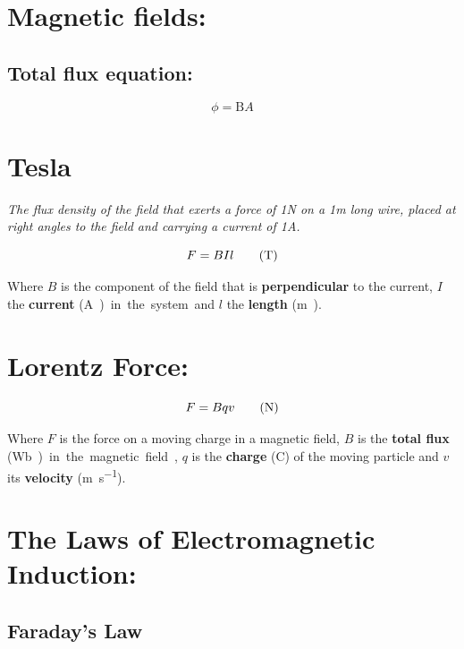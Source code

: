 \documentclass[11pt]{article}
\begin{document}
                          
\section{Magnetic fields: }
\subsection{Total flux equation: }
\begin{equation}
	\phi = \mathrm{B}A\tag{\si\weber}
\end{equation}


  \section{Tesla}
  \begin{center}
  	\textit{The flux density of the field that exerts a force of 1\si{\newton} on a 1\si{\meter} long wire, placed at right angles to the field and carrying a current of 1\si{\ampere}.}
  \end{center}
\begin{equation}
	F=BIl\tag{\si{\tesla}}
\end{equation}
\begin{center}
	Where $B$ is the component of the field that is \textbf{perpendicular} to the current, $I$ the \textbf{current} (\si\ampere) in the system and $l$ the \textbf{length} (\si\meter).
\end{center}
\section{Lorentz Force: }
\begin{equation}
	F=Bqv\tag{\si{\newton}}
\end{equation}
\begin{center}
	Where $F$ is the force on a moving charge in a magnetic field, $B$ is the \textbf{total flux} (\si\weber) in the magnetic field, $q$ is the \textbf{charge} (\si{\coulomb}) of the moving particle and $v$ its \textbf{velocity} (\si{\meter\per\second}).
\end{center}

\section{The Laws of Electromagnetic Induction: }

\subsection{Faraday's Law}
\end{document}
